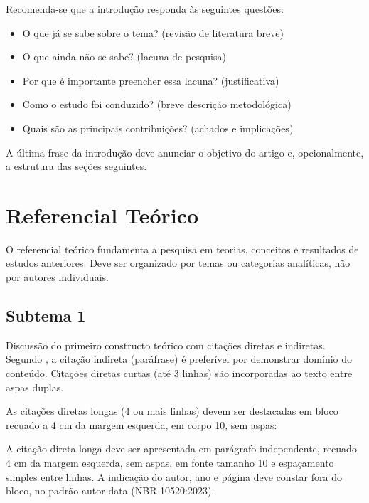 \documentclass[preprint,12pt,review]{elsarticle}
\begin{document}
Recomenda-se que a introdução responda às seguintes questões:
\begin{itemize}
  \item O que já se sabe sobre o tema? (revisão de literatura breve)
  \item O que ainda não se sabe? (lacuna de pesquisa)
  \item Por que é importante preencher essa lacuna? (justificativa)
  \item Como o estudo foi conduzido? (breve descrição metodológica)
  \item Quais são as principais contribuições? (achados e implicações)
\end{itemize}

A última frase da introdução deve anunciar o objetivo do artigo e,
opcionalmente, a estrutura das seções seguintes.

\section{Referencial Teórico}

O referencial teórico fundamenta a pesquisa em teorias, conceitos e
resultados de estudos anteriores. Deve ser organizado por temas ou
categorias analíticas, não por autores individuais.

\subsection{Subtema 1}

Discussão do primeiro constructo teórico com citações diretas e indiretas.
Segundo \cite{autor2021}, a citação indireta (paráfrase) é preferível por
demonstrar domínio do conteúdo. Citações diretas curtas (até 3 linhas) são
incorporadas ao texto entre aspas duplas.

As citações diretas longas (4 ou mais linhas) devem ser destacadas em bloco
recuado a 4 cm da margem esquerda, em corpo 10, sem aspas:

\begin{citacao}
A citação direta longa deve ser apresentada em parágrafo independente,
recuado 4 cm da margem esquerda, sem aspas, em fonte tamanho 10 e
espaçamento simples entre linhas. A indicação do autor, ano e página
deve constar fora do bloco, no padrão autor-data (NBR 10520:2023).
\end{citacao}
\end{document}
